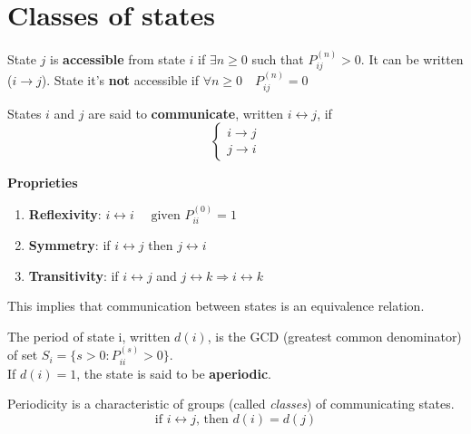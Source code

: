 \section{Classes of states}
	\begin{definition}
		State $j$ is {\bfseries accessible} from state $i$ if $\exists n \geq 0$ such that $P_{ij}^{(n)} > 0$. It can be written ($i \rightarrow j$).
		State it's \textbf{not} accessible if $\forall n \ge 0 \quad P_{ij}^{(n)}=0$
	\end{definition}

	\begin{definition}
		States $i$ and $j$ are said to {\bfseries communicate}, written $ i \leftrightarrow j$, if
		$$\begin{cases}
			i \rightarrow j \\
			j \rightarrow i
		\end{cases}$$
	\end{definition}

	{\bfseries Proprieties}
	\begin{enumerate}
		\item \textbf{Reflexivity}: \quad $i \leftrightarrow i \quad\text{ given } P_{ii}^{(0)}=1$
		\item \textbf{Symmetry}: \quad if $i \leftrightarrow j$ then $j \leftrightarrow i$
		\item \textbf{Transitivity}: \quad if $i \leftrightarrow j$ and $j \leftrightarrow k \Rightarrow i \leftrightarrow k$
	\end{enumerate}
	This implies that communication between states is an equivalence relation.

	\begin{definition}[Periodicity]
		The period of state i, written $d(i)$, is the GCD (greatest common denominator) of set $S_i = \{ s>0 : P_{ii}^{(s)} >0 \}$.\\
		If $d(i)=1$, the state is said to be \textbf{aperiodic}.
	\end{definition}

	\begin{theorem}[Periodicity] Periodicity is a characteristic of groups (called \emph{classes}) of communicating states.
		$$\text{if } i \leftrightarrow j \text{, then } d(i) = d(j)$$
	\end{theorem}

